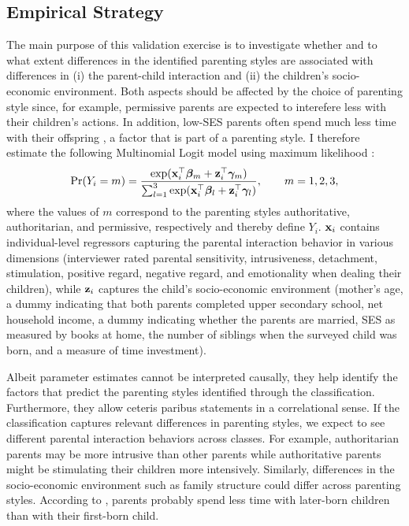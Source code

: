 \subsection{Empirical Strategy}
The main purpose of this validation exercise is to investigate whether and to what extent differences in the identified parenting styles are associated with differences in (i) the parent-child interaction and (ii) the children's socio-economic environment. Both aspects should be affected by the choice of parenting style since, for example, permissive parents are expected to interefere less with their children's actions. In addition, low-SES parents often spend much less time with their offspring \parencite[e.g.][]{falkSocioEconomicStatusInequalities2021}, a factor that is part of a parenting style. I therefore estimate the following Multinomial Logit model using maximum likelihood \parencite[see][chapter 15]{cameronMicroeconometricsMethodsApplications2005}:
\begin{equation}
	\text{Pr}(Y_i = m) = \frac{\exp(\textbf{x}^\top_{i} \bm{\beta}_m + \textbf{z}^\top_{i} \bm{\gamma}_m)}{\sum_{l=1}^{3} \exp(\textbf{x}^\top_{i}\bm{\beta}_l + \textbf{z}^\top_{i} \bm{\gamma}_l)}, \qquad m = 1, 2, 3, \label{eq:multinom}
\end{equation}
where the values of $m$ correspond to the parenting styles authoritative, authoritarian, and permissive, respectively and thereby define $Y_i$. $\textbf{x}_i$ contains individual-level regressors capturing the parental interaction behavior in various dimensions (interviewer rated parental sensitivity, intrusiveness, detachment, stimulation, positive regard, negative regard, and emotionality when dealing their children), while $\textbf{z}_i$ captures the child's socio-economic environment (mother's age, a dummy indicating that both parents completed upper secondary school, net household income, a dummy indicating whether the parents are married, SES as measured by books at home, the number of siblings when the surveyed child was born, and a measure of time investment).

Albeit parameter estimates cannot be interpreted causally, they help identify the factors that predict the parenting styles identified through the classification. Furthermore, they allow ceteris paribus statements in a correlational sense. If the classification captures relevant differences in parenting styles, we expect to see different parental interaction behaviors across classes. For example, authoritarian parents may be more intrusive than other parents while authoritative parents might be stimulating their children more intensively. Similarly, differences in the socio-economic environment such as family structure could differ across parenting styles. According to \textcite{beckerTreatiseFamily1981}, parents probably spend less time with later-born children than with their first-born child.  

